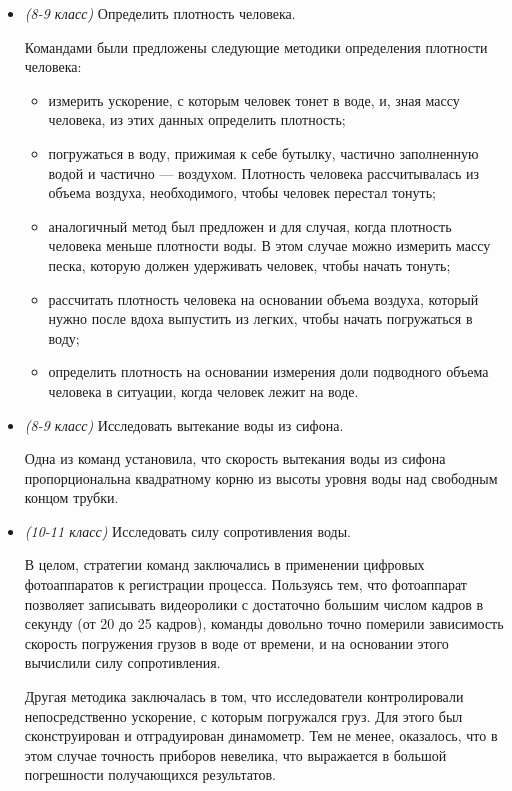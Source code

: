 \documentclass[12pt,a4paper,oneside]{scrartcl}
\newlength{\h}
\newlength{\x}
\begin{document}
\begin{itemize}
\item \textit{(8-9 класс)} Определить плотность человека.

Командами были предложены следующие методики определения плотности 
человека:
\begin{itemize}
\item измерить ускорение, с которым человек тонет в воде, и, зная 
  массу человека, из этих данных определить плотность;
\item погружаться в воду, прижимая к себе бутылку, частично 
  заполненную водой и частично --- воздухом. Плотность человека 
  рассчитывалась из объема воздуха, необходимого, чтобы человек 
  перестал тонуть;
\item аналогичный метод был предложен и для случая, когда плотность 
  человека меньше плотности воды. В этом случае можно измерить массу 
  песка, которую должен удерживать человек, чтобы начать тонуть;
\item рассчитать плотность человека на основании объема воздуха, 
  который нужно после вдоха выпустить из легких, чтобы начать 
  погружаться в воду;
\item определить плотность на основании измерения доли подводного 
  объема человека в ситуации, когда человек лежит на воде.
\end{itemize}

\item \textit{(8-9 класс)} Исследовать вытекание воды из сифона.

  Одна из команд установила, что скорость вытекания воды из сифона 
  пропорциональна квадратному корню из высоты уровня воды над 
  свободным концом трубки.

\item \textit{(10-11 класс)} Исследовать силу сопротивления воды. 

  В целом, стратегии команд заключались в применении цифровых
  фотоаппаратов к регистрации процесса. Пользуясь тем, что фотоаппарат
  позволяет записывать видеоролики с достаточно большим числом кадров
  в секунду (от 20 до 25 кадров), команды довольно точно померили
  зависимость скорость погружения грузов в воде от времени, и на
  основании этого вычислили силу сопротивления.

  Другая методика заключалась в том, что исследователи контролировали
  непосредственно ускорение, с которым погружался груз. Для этого был
  сконструирован и отградуирован динамометр. Тем не менее, оказалось,
  что в этом случае точность приборов невелика, что выражается в
  большой погрешности получающихся результатов. 

\end{itemize}
\end{document}
